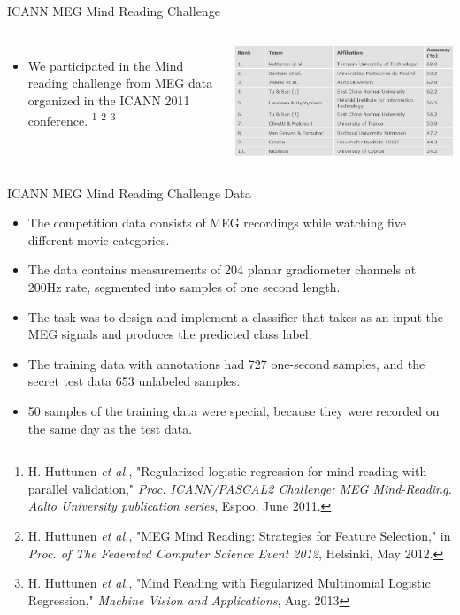 \documentclass[10pt, aspectratio=169]{beamer} %
\begin{document}
\begin{frame}[allowframebreaks=0.8]
{ICANN MEG Mind Reading Challenge}
\begin{columns}
\begin{itemize}
\item We participated in the Mind reading challenge from MEG data organized in the ICANN 2011 conference.
\footnote[frame]{\tiny H. Huttunen \emph{et al.}, "Regularized logistic regression for mind reading with parallel validation,"  \emph{Proc.
ICANN/PASCAL2   Challenge:   MEG   Mind-Reading. Aalto University publication series}, Espoo, June 2011.}
\footnote[frame]{\tiny H. Huttunen \emph{et al.}, "MEG Mind Reading: Strategies for Feature Selection," in \emph{Proc. of The Federated Computer Science Event 2012}, Helsinki, May 2012.}
\footnote[frame]{\tiny H. Huttunen \emph{et al.}, "Mind Reading with Regularized Multinomial Logistic
Regression," \emph{Machine Vision and Applications}, Aug. 2013\vspace{0.5cm}}
\end{itemize}
\centerline{\includegraphics[width=\columnwidth]{ICANNResults.png}}
\end{columns}
\end{frame}

\begin{frame}
{ICANN MEG Mind Reading Challenge Data}
\begin{itemize}
\item The competition data consists of MEG recordings while watching five different movie categories. 
\item The data contains measurements of 204 planar gradiometer channels at 200Hz rate, segmented into samples of one second length. 
\item The task was to design and implement a classifier that takes as an input the MEG signals 
and produces the predicted class label.
\item The training data with annotations had 727 one-second samples, and the secret test data 653 unlabeled samples.
\item 50 samples of the training data were special, because they were recorded on the same day as the
test data.
\end{itemize}
\end{frame}
\end{document}
